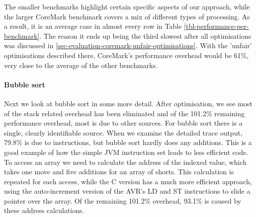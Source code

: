 The smaller benchmarks highlight certain specific aspects of our approach, while the larger CoreMark benchmark covers a mix of different types of processing. As a result, it is an average case in almost every row in Table \ref{tbl-performance-per-benchmark}. The reason it ends up being the third slowest after all optimisations was discussed in \ref{sec-evaluation-coremark-unfair-optimisations}. With the 'unfair' optimisations described there, CoreMark's performance overhead would be 61\%, very close to the average of the other benchmarks.

\paragraph{Bubble sort}
Next we look at bubble sort in some more detail. After optimisation, we see most of the stack related overhead has been eliminated and of the 101.2\% remaining performance overhead, most is due to other sources. For bubble sort there is a single, clearly identifiable source. When we examine the detailed trace output,  79.8\% is due to  instructions, but bubble sort hardly does any additions. This is a good example of how the simple JVM instruction set leads to less efficient code. To access an array we need to calculate the address of the indexed value, which takes one move and five additions for an array of shorts. This calculation is repeated for each access, while the C version has a much more efficient approach, using the auto-increment version of the AVR's LD and ST instructions to slide a pointer over the array. Of the remaining 101.2\% overhead, 93.1\% is caused by these address calculations.

%

